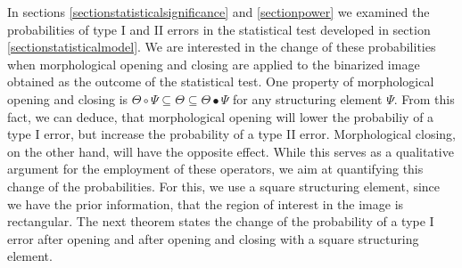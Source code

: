 \documentclass[a4paper,12pt]{article}
\theoremstyle{plain}
\theoremstyle{definition}
\begin{document}
In sections \ref{sectionstatisticalsignificance} and \ref{sectionpower} we examined the probabilities of type I and II errors in the statistical test developed in section \ref{sectionstatisticalmodel}. We are interested in the change of these probabilities when morphological opening and closing are applied to the binarized image obtained as the outcome of the statistical test. One property of morphological opening and closing is $\Theta \circ \Psi \subseteq \Theta \subseteq \Theta \bullet \Psi$ for any structuring element $\Psi$. From this fact, we can deduce, that morphological opening will lower the probabiliy of a type I error, but increase the probability of a type II error. Morphological closing, on the other hand, will have the opposite effect. While this serves as a qualitative argument for the employment of these operators, we aim at quantifying this change of the probabilities. For this, we use a square structuring element, since we have the prior information, that the region of interest in the image is rectangular.
The next theorem states the change of the probability of a type I error after opening and after opening and closing with a square structuring element.
\end{document}
